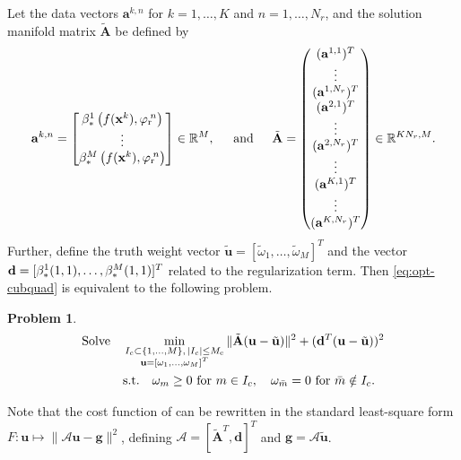 \documentclass[onefignum,onetabnum]{siamart251104}
\newcommand{\bv}[1]{{\mathbf #1}}
\newcommand{\bt}[1]{{\mathbf{#1}}}
\newcommand{\com}[1]{{{#1}_{\rm{c}}}} %
\newcommand{\rom}[1]{{{#1}_{\rm{r}}}}
\newcommand{\Nr}{{N_r}}
\newcommand{\R}{\mathbb{R}}
\newcommand{\tL}{{\fs{\varphi}}}
\newcommand{\fs}[1]{{{#1}}} %
\newcommand{\wei}{{\omega}} %
\newcommand{\vwei}{\bv{u}} %
\newcommand{\Ap}{{\bt{A}}}
\newcommand{\vAp}{\bv{a}}
\newcommand{\dreg}{{{\bv{d}}}}
\newtheorem{prblm}{Problem} %
\begin{document}
Let the data vectors $\vAp^{k,n}$ for $k = 1,\ldots,K$ and $n = 1,\ldots,\Nr$, and the solution manifold matrix $\tilde{\Ap}$ be defined by
{\small
\begin{align} \label{eq:Ab-data}
	\vAp^{k,n} = 
\begin{bmatrix}
\beta_{\rm{*}}^1\left( f(\bv{x}^k), \rom{\tL}\!^n \right) \\
\vdots \\
\beta_{\rm{*}}^M\left( f(\bv{x}^k), \rom{\tL}\!^n \right)
\end{bmatrix} \in \R^{M},
\hspace{0.4cm}
\text{ and } \hspace{0.4cm}
	 	\tilde{\Ap} = \begin{pmatrix}
		(\vAp^{1,1})^T \\
		\vdots \\
		(\vAp^{1,\Nr})^T \\
		(\vAp^{2,1})^T \\
		\vdots \\
		(\vAp^{2,\Nr})^T \\
		\vdots \\
		(\vAp^{K,1})^T \\
		\vdots \\
		(\vAp^{K,\Nr})^T
	\end{pmatrix}  \in \R^{K\Nr , M} .
\end{align}
}%
Further, define the truth weight vector $\tilde{\vwei}=[\tilde{\wei}_1,\ldots,\tilde{\wei}_M]^T$ and the vector $\dreg =[\beta_{\rm{*}}^1(1,1),\ldots,\beta_{\rm{*}}^M(1,1)]^T$ related to the regularization term. Then \eqref{eq:opt-cubquad} is equivalent to the following problem.

\begin{prblm}\label{prob:unc-CrTrain}
\begin{align*}
\text{Solve} \quad & \min_{\substack{I_c \subset \{1,\ldots,M\},\, |I_c| \leq \com{M} \\ \vwei=[\wei_1,\ldots,\wei_M]^T}} 
\| \tilde{\Ap}(\vwei - \tilde{\vwei}) \|^2 + (\dreg^T(\vwei - \tilde{\vwei}))^2 \\
& \text{s.t.} \quad \wei_m \geq 0 \text{ for } m \in I_c,\quad \wei_{\bar{m}} = 0 \text{ for } \bar{m} \notin I_c.
\end{align*}
\end{prblm}
\begin{rmrk}\label{rem:standard-least-squares}
Note that the cost function of  can be rewritten in the standard least-square form $F: \vwei \mapsto \| \mathcal{A} \vwei -\bv{g} \|^2$, defining  $\mathcal{A} =  [\tilde{\Ap}^T, \dreg]^T$ and  $\bv{g} = \mathcal{A} \tilde{\vwei}$. 
\end{rmrk}
\end{document}
